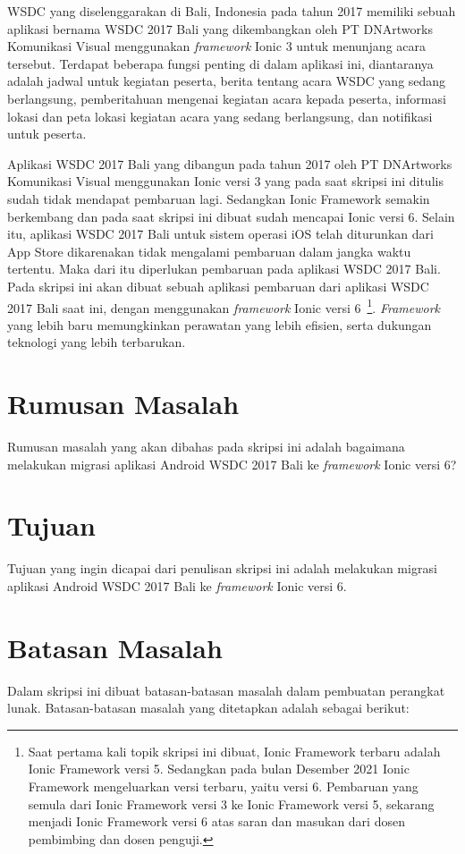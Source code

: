 WSDC yang diselenggarakan di Bali, Indonesia pada tahun 2017 memiliki sebuah aplikasi bernama WSDC 2017 Bali yang dikembangkan oleh PT DNArtworks Komunikasi Visual menggunakan \textit{framework} Ionic 3 untuk menunjang acara tersebut. Terdapat beberapa fungsi penting di dalam aplikasi ini, diantaranya adalah jadwal untuk kegiatan peserta, berita tentang acara WSDC yang sedang berlangsung, pemberitahuan mengenai kegiatan acara kepada peserta, informasi lokasi dan peta lokasi kegiatan acara yang sedang berlangsung, dan notifikasi untuk peserta. 

Aplikasi WSDC 2017 Bali yang dibangun pada tahun 2017 oleh PT DNArtworks Komunikasi Visual menggunakan Ionic versi 3 yang pada saat skripsi ini ditulis sudah tidak mendapat pembaruan lagi. Sedangkan Ionic Framework semakin berkembang dan pada saat skripsi ini dibuat sudah mencapai Ionic versi 6. Selain itu, aplikasi WSDC 2017 Bali untuk sistem operasi iOS telah diturunkan dari App Store dikarenakan tidak mengalami pembaruan dalam jangka waktu tertentu. Maka dari itu diperlukan pembaruan pada aplikasi WSDC 2017 Bali. Pada skripsi ini akan dibuat sebuah aplikasi pembaruan dari aplikasi WSDC 2017 Bali saat ini, dengan menggunakan \textit{framework} Ionic versi 6~\footnote{Saat pertama kali topik skripsi ini dibuat, Ionic Framework terbaru adalah Ionic Framework versi 5. Sedangkan pada bulan Desember 2021 Ionic Framework mengeluarkan versi terbaru, yaitu versi 6. Pembaruan yang semula dari Ionic Framework versi 3 ke Ionic Framework versi 5, sekarang menjadi Ionic Framework versi 6 atas saran dan masukan dari dosen pembimbing dan dosen penguji.}. \textit{Framework} yang lebih baru memungkinkan perawatan yang lebih efisien, serta dukungan teknologi yang lebih terbarukan.

\section{Rumusan Masalah}
\label{sec:rumusan}
Rumusan masalah yang akan dibahas pada skripsi ini adalah bagaimana melakukan migrasi aplikasi Android WSDC 2017 Bali ke {\it framework} Ionic versi 6?

\section{Tujuan}
\label{sec:tujuan}
Tujuan yang ingin dicapai dari penulisan skripsi ini adalah melakukan migrasi aplikasi Android WSDC 2017 Bali ke {\it framework} Ionic versi 6.

\section{Batasan Masalah}
\label{sec:batasan}
Dalam skripsi ini dibuat batasan-batasan masalah dalam pembuatan perangkat lunak.  Batasan-batasan masalah yang ditetapkan adalah sebagai berikut:

